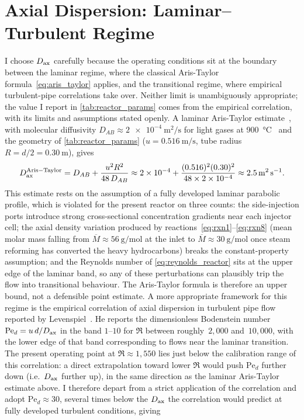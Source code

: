 \section{Axial Dispersion: Laminar--Turbulent Regime}\label{sec:Dax_dispersion}

I choose \(D_{\mathrm{ax}}\) carefully because the operating conditions sit at the boundary between the laminar regime, where the classical Aris-Taylor formula~\eqref{eq:aris_taylor} applies, and the transitional regime, where empirical turbulent-pipe correlations take over. Neither limit is unambiguously appropriate; the value I report in \cref{tab:reactor_params} comes from the empirical correlation, with its limits and assumptions stated openly. A laminar Aris-Taylor estimate~\cite{Taylor1953, Aris1956}, with molecular diffusivity \(D_{AB} \approx \SI{2e-4}{\metre\squared\per\second}\) for light gases at \SI{900}{\degreeCelsius}~\cite{Fogler2006} and the geometry of \cref{tab:reactor_params} (\(u = \SI{0.516}{\metre\per\second}\), tube radius \(R = d/2 = \SI{0.30}{\metre}\)), gives
%
\begin{equation*}
  D_{\mathrm{ax}}^{\mathrm{Aris-Taylor}}
  = D_{AB} + \frac{u^2 R^2}{48\,D_{AB}}
  \approx 2\times 10^{-4} + \frac{(0.516)^2 (0.30)^2}{48\times 2\times 10^{-4}}
  \approx \SI{2.5}{\metre\squared\per\second}.
\end{equation*}
%
This estimate rests on the assumption of a fully developed laminar parabolic profile, which is violated for the present reactor on three counts: the side-injection ports introduce strong cross-sectional concentration gradients near each injector cell; the axial density variation produced by reactions~\eqref{eq:rxn1}--\eqref{eq:rxn8} (mean molar mass falling from \(\overline{M}\approx\SI{56}{\gram\per\mol}\) at the inlet to \(\overline{M}\approx\SI{30}{\gram\per\mol}\) once steam reforming has converted the heavy hydrocarbons) breaks the constant-property assumption; and the Reynolds number of \cref{eq:reynolds_reactor} sits at the upper edge of the laminar band, so any of these perturbations can plausibly trip the flow into transitional behaviour. The Aris-Taylor formula is therefore an upper bound, not a defensible point estimate. A more appropriate framework for this regime is the empirical correlation of axial dispersion in turbulent pipe flow reported by Levenspiel~\cite{Levenspiel1999}. He reports the dimensionless Bodenstein number \(\mathrm{Pe}_d = u\,d/D_{\mathrm{ax}}\) in the band \(1\)--\(10\) for \(\Re\) between roughly~\(2{,}000\) and~\(10{,}000\), with the lower edge of that band corresponding to flows near the laminar transition. The present operating point at \(\Re \approx 1{,}550\) lies just below the calibration range of this correlation: a direct extrapolation toward lower \(\Re\) would push \(\mathrm{Pe}_d\) further down (i.e.\ \(D_{\mathrm{ax}}\) further up), in the same direction as the laminar Aris-Taylor estimate above. I therefore depart from a strict application of the correlation and adopt \(\mathrm{Pe}_d \approx 30\), several times below the \(D_{\mathrm{ax}}\) the correlation would predict at fully developed turbulent conditions, giving
